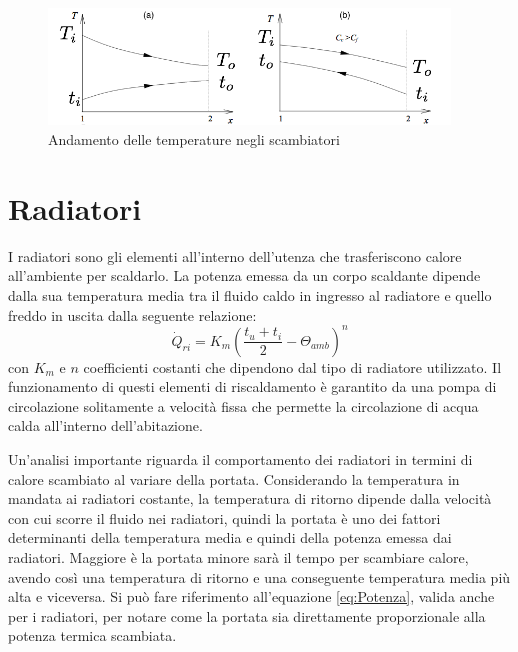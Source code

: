 \documentclass[laurea,oneside,11pt]{USiena_tesiLM}
\begin{document}
\begin{figure}[h]
\begin{center}
\includegraphics[width=0.95\textwidth]{figure/grafico_scambiatore} %
\caption{Andamento delle temperature negli scambiatori }
\label{fig:andamento}
\end{center}
\end{figure}

\section{Radiatori}
\label{subsec:radiatori}
I radiatori sono gli elementi all'interno dell'utenza che trasferiscono calore all'ambiente per scaldarlo. 
La potenza emessa da un corpo scaldante dipende dalla sua temperatura media tra il fluido caldo in ingresso al radiatore e quello freddo in uscita dalla seguente relazione:
\begin{equation}
\dot{Q}_{ri}= K_m(\frac{t_u + t_i}{2} - \Theta_{amb})^n
\label{eq:potenza_radiatori}
\end{equation}
con $K_m$ e $n$ coefficienti costanti che dipendono dal tipo di radiatore utilizzato. 
Il funzionamento di questi elementi di riscaldamento è garantito da una pompa di circolazione solitamente a velocità fissa che permette la circolazione di acqua calda all'interno dell'abitazione. 

Un'analisi importante riguarda il comportamento dei radiatori in termini di calore scambiato al variare della portata. Considerando la temperatura in mandata ai radiatori costante, la temperatura di ritorno dipende  dalla velocità con cui scorre il fluido nei radiatori, quindi la portata è uno dei fattori determinanti della temperatura media e quindi della potenza emessa dai radiatori. Maggiore è la portata minore sarà il tempo per scambiare calore, avendo così una temperatura di ritorno e una conseguente temperatura media più alta e viceversa. Si può fare riferimento all'equazione \ref{eq:Potenza}, valida anche per i radiatori, per notare come la portata sia direttamente proporzionale alla potenza termica scambiata. 
\end{document}
